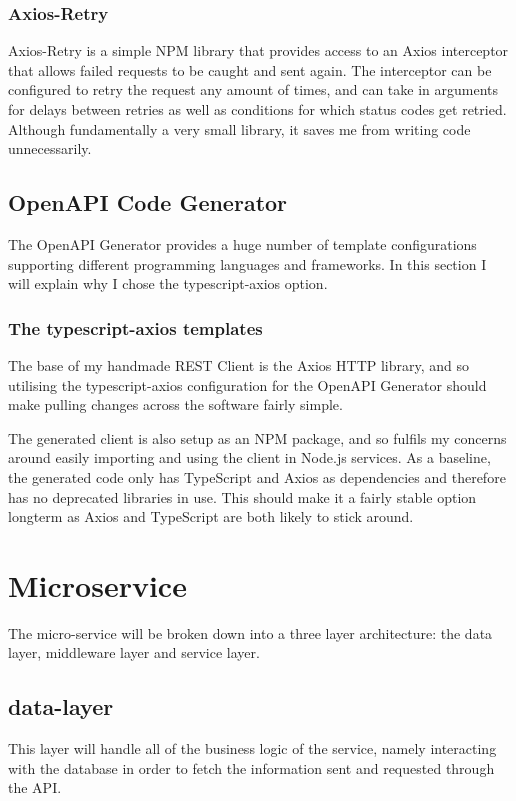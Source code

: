 \subsubsection{Axios-Retry}
Axios-Retry is a simple NPM library that provides access to an Axios interceptor that allows failed requests to be caught and sent again. The interceptor can be configured to retry the request any amount of times, and can take in arguments for delays between retries as well as conditions for which status codes get retried. Although fundamentally a very small library, it saves me from writing code unnecessarily. 

\subsection{OpenAPI Code Generator}
The OpenAPI Generator provides a huge number of template configurations supporting different programming languages and frameworks. In this section I will explain why I chose the typescript-axios option.
\subsubsection{The typescript-axios templates}
The base of my handmade REST Client is the Axios HTTP library, and so utilising the typescript-axios configuration for the OpenAPI Generator should make pulling changes across the software fairly simple.

The generated client is also setup as an NPM package, and so fulfils my concerns around easily importing and using the client in Node.js services. As a baseline, the generated code only has TypeScript and Axios as dependencies and therefore has no deprecated libraries in use. This should make it a fairly stable option longterm as Axios and TypeScript are both likely to stick around. 
\section{Microservice}
The micro-service will be broken down into a three layer architecture: the data layer, middleware layer and service layer.
\subsection{data-layer}
This layer will handle all of the business logic of the service, namely interacting with the database in order to fetch the information sent and requested through the API.
